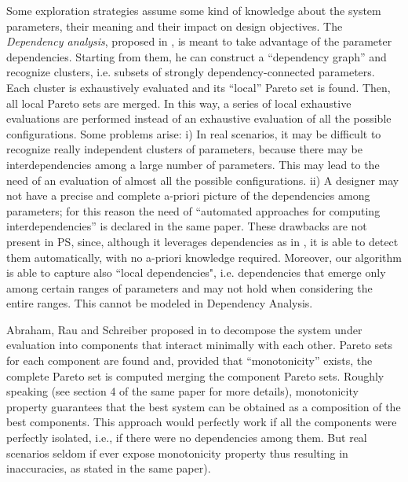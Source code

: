 Some exploration strategies assume some kind of knowledge about the
system parameters, their meaning and their impact on design
objectives.  The \emph{Dependency analysis}, proposed in
\cite{givargis_tvlsi02}, is meant to take advantage of the parameter
dependencies. Starting from them, he can construct a ``dependency graph''
and recognize clusters, i.e. subsets of strongly dependency-connected
parameters. Each cluster is exhaustively evaluated and its ``local''
Pareto set is found. Then, all local Pareto sets are merged. In this
way, a series of local exhaustive evaluations are performed instead of
an exhaustive evaluation of all the possible configurations. Some
problems arise: i) In real scenarios, it may be difficult to recognize
really independent clusters of parameters, because there may be
interdependencies among a large number of parameters. This may lead to
the need of an evaluation of almost all the possible configurations.
ii) A designer may not have a precise and complete a-priori picture of
the dependencies among parameters; for this reason the need of
``automated approaches for computing interdependencies'' is declared
in the same paper.  These drawbacks are not present in PS,
since, although it leverages dependencies as in
\cite{givargis_tvlsi02}, it is able to detect them automatically, with
no a-priori knowledge required. Moreover, our algorithm is able to
capture also ``local dependencies", i.e. dependencies that emerge only
among certain ranges of parameters and may not hold when considering
the entire ranges. This cannot be modeled in Dependency Analysis. 

Abraham, Rau and Schreiber proposed in \cite{santosh_hptr00} to decompose
the system under evaluation into components that interact minimally
with each other. Pareto sets for each component are found and, provided
that ``monotonicity'' exists, the complete Pareto set is computed
merging the component Pareto sets. Roughly speaking (see section 4
of the same paper for more details), monotonicity property guarantees
that the best system can be obtained as a composition of the best
components. This approach would perfectly work if all the components
were perfectly isolated, i.e., if there were no dependencies among
them. But real scenarios seldom if ever
expose monotonicity property thus resulting in inaccuracies, as stated in the same paper).

